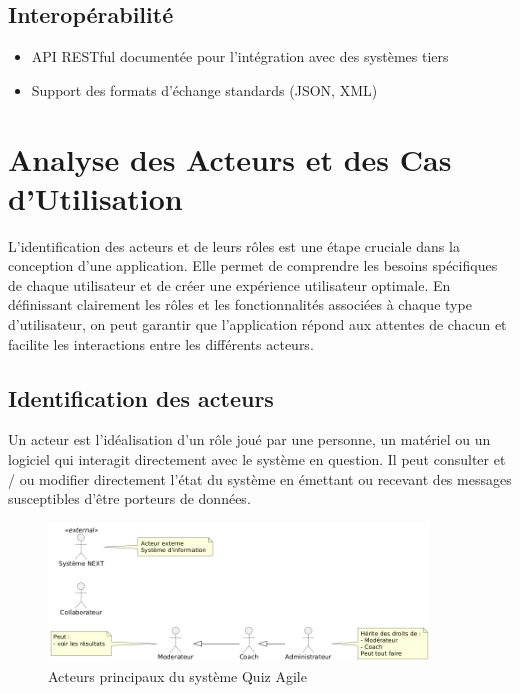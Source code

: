 \documentclass[12pt,a4paper]{report}
\begin{document}
\subsection{Interopérabilité}

\begin{itemize}
\item API RESTful documentée pour l'intégration avec des systèmes tiers
\item Support des formats d'échange standards (JSON, XML)
\end{itemize}

\section{Analyse des Acteurs et des Cas d'Utilisation}

L'identification des acteurs et de leurs rôles est une étape cruciale dans la conception d'une application. Elle permet de comprendre les besoins spécifiques de chaque utilisateur et de créer une expérience utilisateur optimale. En définissant clairement les rôles et les fonctionnalités associées à chaque type d'utilisateur, on peut garantir que l'application répond aux attentes de chacun et facilite les interactions entre les différents acteurs.

\subsection{Identification des acteurs}

Un acteur est l'idéalisation d'un rôle joué par une personne, un matériel ou un logiciel qui interagit directement avec le système en question. Il peut consulter et / ou modifier directement l'état du système en émettant ou recevant des messages susceptibles d'être porteurs de données.

\begin{figure}[H]
\centering
\includegraphics[width=0.9\textwidth]{latex_media/media/image13.png}
\caption{Acteurs principaux du système Quiz Agile}
\label{fig:acteurs-principaux}
\end{figure}
\end{document}
